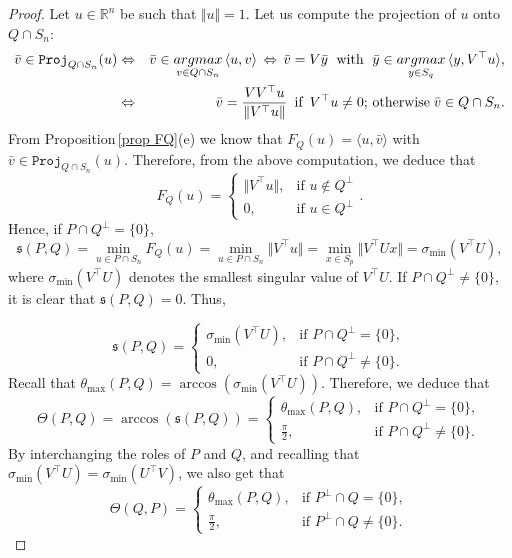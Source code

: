 \documentclass[10pt,a4paper]{amsart}
\newcommand{\R}{\mathbb R}
\newcommand{\argmax}{\mathop{\rm argmax}}
\newcommand{\bv}{\bar{v}}
\newcommand{\by}{\bar{y}}
\newcommand{\proj}{\mathtt{Proj}}
\begin{document}
\begin{proof}
Let $u\in\R^n$ be such that $\Vert u\Vert=1$. Let us compute the projection of $u$ onto $Q\cap S_n$:
\begin{eqnarray*}
\bv\in \proj_{Q\cap S_n}(u)&\Leftrightarrow&\bv\in\argmax_{v\in Q\cap S_n}\,\langle u,v\rangle\,\Leftrightarrow\, \bv=V\bar y\;\text{ with }\; \by\in\argmax_{y\in S_q}\,\langle y,V^\top u\rangle,\\
&\Leftrightarrow&\bv=\frac{VV^\top u}{\Vert V^\top u\Vert}\,\text{ if }\,V^\top u\neq 0; \,\text{otherwise}\;\bv\in Q\cap S_n.
\end{eqnarray*}
From Proposition\,\ref{prop FQ}(e) we know that $F_Q(u)=\langle u,\bv\rangle$ with $\bv\in \proj_{Q\cap S_n}(u)$. Therefore, from the above computation, we deduce that
\[F_Q(u)=\begin{cases}
\Vert V^\top u\Vert,&\text{if }u\notin Q^\perp\\
0,&\text{if }u\in Q^\perp
\end{cases}.\]
Hence, if $P\cap Q^\perp=\{0\}$,
\[\mathfrak{s}(P,Q)=\min_{u\in P\cap S_n}F_Q(u)=\min_{u\in P\cap S_n}\Vert V^\top u\Vert=\min_{x\in S_p}\Vert V^\top Ux\Vert=\sigma_{\min}(V^\top U),\]
where $\sigma_{\min}(V^\top U)$ denotes the smallest singular value of $V^\top U$. If $P\cap Q^\perp\neq\{0\}$, it is clear that $\mathfrak{s}(P,Q)=0$. Thus,

\[\mathfrak{s}(P,Q)=\begin{cases}
\sigma_{\min}(V^\top U),&\text{if }P\cap Q^\perp=\{0\},\\
0,&\text{if }P\cap Q^\perp\neq\{0\}.
\end{cases}\]
Recall that $\theta_{\max}(P,Q)=\arccos(\sigma_{\min}(V^\top U))$. Therefore, we deduce that
\begin{equation}\label{theta-arccos}
\Theta(P,Q)=\arccos(\mathfrak{s}(P,Q))=\begin{cases}
\theta_{\max}(P,Q),&\text{if }P\cap Q^\perp=\{0\},\\
\frac{\pi}{2},&\text{if }P\cap Q^\perp\neq\{0\}.
\end{cases}
\end{equation}
By interchanging the roles of $P$ and $Q$, and recalling that $\sigma_{\min}(V^\top U)=\sigma_{\min}(U^\top V)$, we also get that
\begin{equation}\label{theta-arccos2}
\Theta(Q,P)=\begin{cases}
\theta_{\max}(P,Q),&\text{if }P^\perp\cap Q=\{0\},\\
\frac{\pi}{2},&\text{if }P^\perp\cap Q\neq\{0\}.
\end{cases}
\end{equation}


\end{proof}
\end{document}
